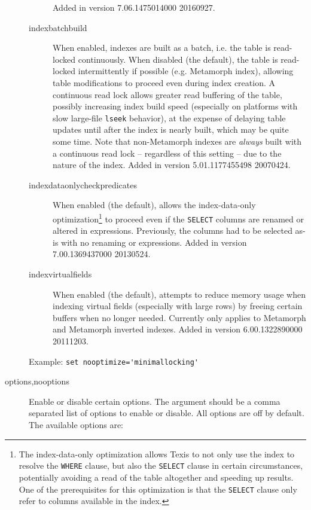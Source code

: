 \begin{description}
\begin{description}
  Added in version 7.06.1475014000 20160927.

\item[indexbatchbuild] When enabled, indexes are built as a batch,
i.e. the table is read-locked continuously.  When disabled (the
default), the table is read-locked intermittently if possible
(e.g. Metamorph index), allowing table modifications to proceed even
during index creation.  A continuous read lock allows greater read
buffering of the table, possibly increasing index build speed
(especially on platforms with slow large-file \verb`lseek` behavior),
at the expense of delaying table updates until after the index is
nearly built, which may be quite some time.  Note that non-Metamorph
indexes are {\em always} built with a continuous read lock --
regardless of this setting -- due to the nature of the index.  Added
in version 5.01.1177455498 20070424.

\item[indexdataonlycheckpredicates] When enabled (the default), allows
  the index-data-only optimization\footnote{The index-data-only
    optimization allows Texis to not only use the index to resolve the
    {\tt WHERE} clause, but also the {\tt SELECT} clause in certain
    circumstances, potentially avoiding a read of the table altogether
    and speeding up results.  One of the prerequisites for this
    optimization is that the {\tt SELECT} clause only refer to columns
    available in the index.} to proceed even if the {\tt SELECT}
  columns are renamed or altered in expressions.  Previously, the
  columns had to be selected as-is with no renaming or expressions.
  Added in version 7.00.1369437000 20130524.

\item[indexvirtualfields] When enabled (the default), attempts to
  reduce memory usage when indexing virtual fields (especially with
  large rows) by freeing certain buffers when no longer needed.
  Currently only applies to Metamorph and Metamorph inverted indexes.
  Added in version 6.00.1322890000 20111203.

\end{description}
Example:  \verb`set nooptimize='minimallocking'`

\item[options,nooptions] Enable or disable certain options.  The
  argument should be a comma separated list of options to enable or
  disable.  All options are off by default.  The available options are:


\end{description}
